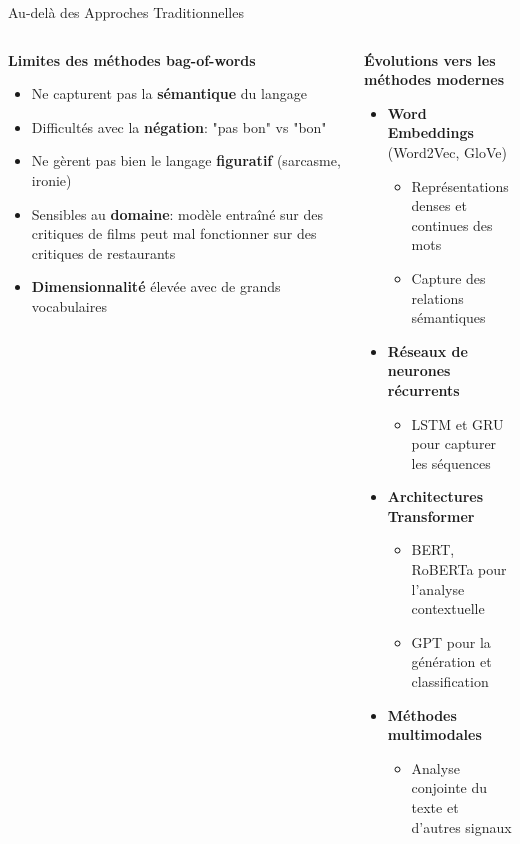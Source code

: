 \documentclass[aspectratio=169,11pt]{beamer}
\begin{document}
\begin{frame}{Au-delà des Approches Traditionnelles}
    \begin{columns}
        \begin{column}{0.45\textwidth}
            \textbf{Limites des méthodes bag-of-words}
            \begin{itemize}
                \item Ne capturent pas la \textbf{sémantique} du langage
                \item Difficultés avec la \textbf{négation}: "pas bon" vs "bon"
                \item Ne gèrent pas bien le langage \textbf{figuratif} (sarcasme, ironie)
                \item Sensibles au \textbf{domaine}: modèle entraîné sur des critiques de films peut mal fonctionner sur des critiques de restaurants
                \item \textbf{Dimensionnalité} élevée avec de grands vocabulaires
            \end{itemize}
        \end{column}
        
        \begin{column}{0.55\textwidth}
            \textbf{Évolutions vers les méthodes modernes}
            \begin{itemize}
                \item \textbf{Word Embeddings} (Word2Vec, GloVe)
                \begin{itemize}
                    \item Représentations denses et continues des mots
                    \item Capture des relations sémantiques
                \end{itemize}
                \item \textbf{Réseaux de neurones récurrents}
                \begin{itemize}
                    \item LSTM et GRU pour capturer les séquences
                \end{itemize}
                \item \textbf{Architectures Transformer}
                \begin{itemize}
                    \item BERT, RoBERTa pour l'analyse contextuelle
                    \item GPT pour la génération et classification
                \end{itemize}
                \item \textbf{Méthodes multimodales}
                \begin{itemize}
                    \item Analyse conjointe du texte et d'autres signaux
                \end{itemize}
            \end{itemize}
        \end{column}
    \end{columns}
\end{frame}
\end{document}
